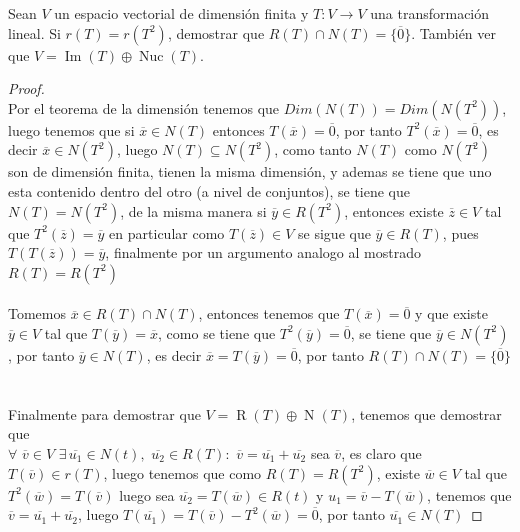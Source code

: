 \documentclass[11pt]{article}
\numberwithin{equation}{section}
\begin{document}
\begin{Problema}{} Sean $V$ un espacio vectorial de dimensión finita y $T: V \to V$ una transformación lineal. 
    Si $r(T) = r(T^2)$, demostrar que $R(T) \cap N(T) = \{\overline{0}\}$. También ver que $V = \operatorname{Im}(T) \oplus \operatorname{Nuc}(T)$.
\end{Problema}
\begin{proof}\,\\
    Por el teorema de la dimensión tenemos que $Dim(N(T))=Dim(N(T^2))$, luego tenemos que
    si $\overline{x}\in N(T)$ entonces $T(\overline{x})=\overline{0}$, por tanto $T^2(\overline{x})=\overline{0}$,
    es decir $\overline{x}\in N(T^2)$, luego $N(T)\subseteq N(T^2)$, como tanto
    $N(T)$ como $N(T^2)$ son de dimensión finita, tienen la misma dimensión, y ademas
    se tiene que uno esta contenido dentro del otro (a nivel de conjuntos), se tiene que $N(T)=N(T^2)$, de la misma manera si $\overline{y}\in R(T^2)$, entonces
    existe $\overline{z}\in V$ tal que $T^2(\overline{z})=\overline{y}$ en particular
    como $T(\overline{z})\in V$ se sigue que $\overline{y}\in R(T)$, pues $T(T(\overline{z}))=\overline{y}$, finalmente
    por un argumento analogo al mostrado $R(T)=R(T^2)$\,\\
    \,\\
    Tomemos $\overline{x}\in R(T) \cap N(T) $, entonces tenemos que $T(\overline{x})=\overline{0}$ y que existe $\overline{y}\in V$ tal 
    que $T(\overline{y})=\overline{x}$, como se tiene que $T^2(\overline{y})=\overline{0}$, se tiene que $\overline{y}\in N(T^2)$, por tanto
    $\overline{y}\in N(T)$, es decir $\overline{x}=T(\overline{y})=\overline{0}$, por tanto $R(T) \cap N(T) = \{\overline{0}\}$\,\\
    \,\\
    Finalmente para demostrar que $V = \operatorname{R}(T) \oplus \operatorname{N}(T)$, tenemos que demostrar que\\ $\forall\,\,\overline{v}\in V\,\,\exists\,\overline{u_1}\in N(t),\,\,\overline{u_2}\in R(T):\,\,\overline{v}=\overline{u_1}+\overline{u_2}$
    sea $\overline{v}$, es claro que $T(\overline{v})\in r(T)$, luego tenemos que como $R(T)=R(T^2)$, existe $\overline{w}\in V$ tal que $T^2(\overline{w})=T(\overline{v})$
    luego sea $\overline{u_2}=T(\overline{w})\in R(t)$ y $u_1=\overline{v}-T(\overline{w})$, tenemos que
    $\overline{v}=\overline{u_1}+\overline{u_2}$, luego $T(\overline{u_1})=T(\overline{v})-T^2(\overline{w})=\overline{0}$, por tanto
    $\overline{u_1}\in N(T)$ 
\end{proof}
\,\\
\end{document}
